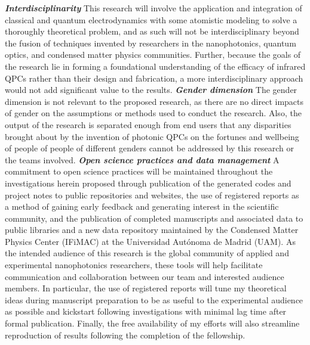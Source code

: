 \documentclass[11pt,a4paper]{article}
\begin{document}
\textbf{\textit{Interdisciplinarity}} This research will involve the application and integration of classical and quantum electrodynamics with some atomistic modeling to solve a thoroughly theoretical problem, and as such will not be interdisciplinary beyond the fusion of techniques invented by researchers in the nanophotonics, quantum optics, and condensed matter physics communities. Further, because the goals of the research lie in forming a foundational understanding of the efficacy of infrared QPCs rather than their design and fabrication, a more interdisciplinary approach would not add significant value to the results. \textbf{\textit{Gender dimension}} The gender dimension is not relevant to the proposed research, as there are no direct impacts of gender on the assumptions or methods used to conduct the research. Also, the output of the research is separated enough from end users that any disparities brought about by the invention of photonic QPCs on the fortunes and wellbeing of people of people of different genders cannot be addressed by this research or the teams involved. \textbf{\textit{Open science practices and data management}} A commitment to open science practices will be maintained throughout the investigations herein proposed through publication of the generated codes and project notes to public repositories and websites, the use of registered reports as a method of gaining early feedback and generating interest in the scientific community, and the publication of completed manuscripts and associated data to public libraries and a new data repository maintained by the Condensed Matter Physics Center (IFiMAC) at the Universidad Aut\'{o}noma de Madrid (UAM). As the intended audience of this research is the global community of applied and experimental nanophotonics researchers, these tools will help facilitate communication and collaboration between our team and interested audience members. In particular, the use of registered reports will tune my theoretical ideas during manuscript preparation to be as useful to the experimental audience as possible and kickstart following investigations with minimal lag time after formal publication. Finally, the free availability of my efforts will also streamline reproduction of results following the completion of the fellowship.

\end{document}
